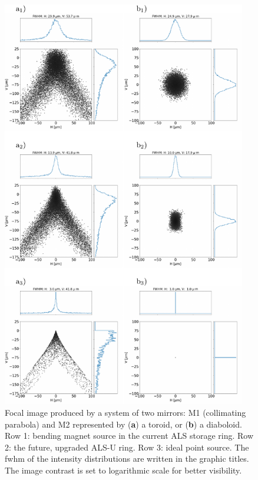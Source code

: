 \documentclass[preprint]{iucr}       %
\begin{document}
\begin{figure}\label{fig:als}
\includegraphics[width=0.95\textwidth]{figures/fig4.pdf}
% 
% 
% 
% 
\caption{Focal image produced by a system of two mirrors: M1 (collimating parabola) and M2 represented by (\textbf{a}) a toroid, or (\textbf{b}) a diaboloid. Row 1: bending magnet source in the current ALS storage ring. Row 2: the future, upgraded ALS-U ring. Row 3: ideal point source. The fwhm of the intensity distributions are written in the graphic titles. The image contrast is set to logarithmic scale for better visibility.}
\end{figure}
\end{document}
